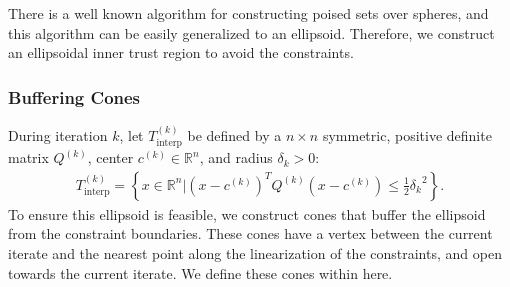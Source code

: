 \documentclass{article}
\theoremstyle{case}
\numberwithin{theorem}{subsection}
\newcommand{\ck}{{c^{(k)}}}
\newcommand{\qk}{{Q^{(k)}}}
\newcommand{\Rn}{\mathbb R^n}
\newcommand{\sampletrk}{{T_{\text{interp}}^{(k)}}}
\newcommand{\sdk}{{\delta_k}}
\begin{document}
There is a well known algorithm for constructing poised sets over spheres, and this algorithm can be easily generalized to an ellipsoid.
Therefore, we construct an ellipsoidal inner trust region to avoid the constraints.


\subsubsection{Buffering Cones}
\label{ellipsoid_requirements}
During iteration $k$, let $\sampletrk$ be defined by a $n\times n$ symmetric, positive definite matrix $\qk$, center $\ck \in \Rn$, and radius $\delta_{k} > 0$:
\begin{align}
\sampletrk = \left \{x \in \Rn | (x - \ck)^T \qk(x - \ck) \le \frac 1 2 \sdk^2 \right \}. \label{define_sampletrk}
\end{align}
To ensure this ellipsoid is feasible, we construct cones that buffer the ellipsoid from the constraint boundaries.
These cones have a vertex between the current iterate and the nearest point along the linearization of the constraints, and open towards the current iterate.
We define these cones within here.
\end{document}
